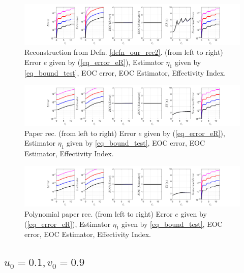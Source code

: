 \documentclass[12pt,a4paper]{article}
\numberwithin{equation}{section}
\theoremstyle{definition}
\begin{document}
\begin{figure}[H]
	\hspace{-3cm}
	\includegraphics[scale=0.55]{fig_LeapFrogplots_1x5_sin_IC_harmonic_order_2_u0_v10_rec2}	
	\caption{Reconstruction from Defn. \ref{defn_our_rec2}. (from left to right) Error $e$ given by (\ref{eq_error_eR}), Estimator $\eta_1$ given by \ref{eq_bound_test}, EOC error, EOC Estimator, Effectivity Index.}
	\label{fig_all_in_one_our_rec_2_u0_v10}
\end{figure}

\begin{figure}[H]
	\hspace{-3cm}
	\includegraphics[scale=0.55]{fig_LeapFrogplots_1x5_sin_IC_harmonic_u0_v10_paperrec}	
	\caption{Paper rec. (from left to right) Error $e$ given by (\ref{eq_error_eR}), Estimator $\eta_1$ given by \ref{eq_bound_test}, EOC error, EOC Estimator, Effectivity Index.}
	\label{fig_all_in_one_paperrec_u0_v10}
\end{figure}

\begin{figure}[H]
	\hspace{-3cm}
	\includegraphics[scale=0.55]{fig_LeapFrogplots_1x5_sin_IC_harmonic_u0_v10_paperrec_poly}	
	\caption{Polynomial paper rec. (from left to right) Error $e$ given by (\ref{eq_error_eR}), Estimator $\eta_1$ given by \ref{eq_bound_test}, EOC error, EOC Estimator, Effectivity Index.}
	\label{fig_all_in_one_paperrec_poly_u0_v10}
\end{figure}

\subsection*{$u_0=0.1, v_0= 0.9$}
\end{document}
